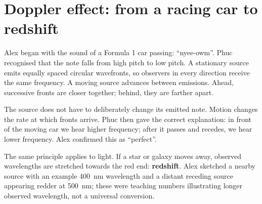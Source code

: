 \documentclass[11pt,a4paper]{article}
\newcommand{\term}[1]{\textbf{#1}}
\begin{document}
\section{Doppler effect: from a racing car to redshift}
Alex began with the sound of a Formula 1 car passing: ``nyee-owm''. Phuc recognised that the note falls from high pitch to low pitch. A stationary source emits equally spaced circular wavefronts, so observers in every direction receive the same frequency. A moving source advances between emissions. Ahead, successive fronts are closer together; behind, they are farther apart.

\begin{center}
\end{center}

The source does not have to deliberately change its emitted note. Motion changes the rate at which fronts arrive. Phuc then gave the correct explanation: in front of the moving car we hear higher frequency; after it passes and recedes, we hear lower frequency. Alex confirmed this as ``perfect''.

The same principle applies to light. If a star or galaxy moves away, observed wavelengths are stretched towards the red end: \term{redshift}. Alex sketched a nearby source with an example \SI{400}{\nano\metre} wavelength and a distant receding source appearing redder at \SI{500}{\nano\metre}; these were teaching numbers illustrating longer observed wavelength, not a universal conversion.

\begin{center}
\end{center}
\end{document}
